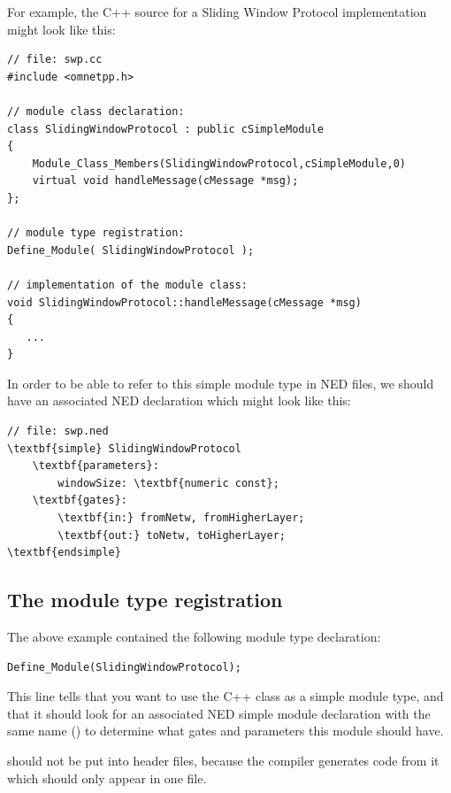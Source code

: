 For example, the C++ source for a Sliding Window Protocol implementation
might look like this:

\begin{verbatim}
// file: swp.cc
#include <omnetpp.h>

// module class declaration:
class SlidingWindowProtocol : public cSimpleModule
{
    Module_Class_Members(SlidingWindowProtocol,cSimpleModule,0)
    virtual void handleMessage(cMessage *msg);
};

// module type registration:
Define_Module( SlidingWindowProtocol );

// implementation of the module class:
void SlidingWindowProtocol::handleMessage(cMessage *msg)
{
   ...
}
\end{verbatim}

In order to be able to refer to this simple module type in NED
files, we should have an associated NED declaration which might
look like this:

\begin{Verbatim}[commandchars=\\\{\}]
// file: swp.ned
\textbf{simple} SlidingWindowProtocol
    \textbf{parameters}:
        windowSize: \textbf{numeric const};
    \textbf{gates}:
        \textbf{in:} fromNetw, fromHigherLayer;
        \textbf{out:} toNetw, toHigherLayer;
\textbf{endsimple}
\end{Verbatim}


\subsection{The module type registration}

The above example contained the following module type declaration:

\begin{verbatim}
Define_Module(SlidingWindowProtocol);
\end{verbatim}

This line tells {\opp} that you want to use the 
C++ class as a simple module type, and that it should look for an associated
NED simple module declaration with the same name () to determine what gates and parameters this module should have.

 should not be put into header files, because the compiler
generates code from it which should only appear in one  file.


